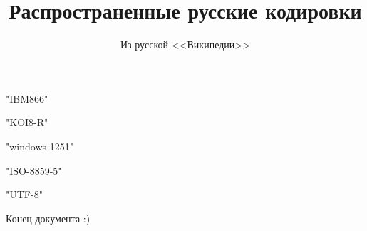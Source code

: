 \documentclass{article}
\title{Распространенные русские кодировки}
\author{Из русской <<Википедии>>}
\date{}
\begin{document}
\maketitle

\tableofcontents


\XeTeXdefaultencoding "IBM866"


\XeTeXdefaultencoding "KOI8-R"


\XeTeXdefaultencoding "windows-1251"


\XeTeXdefaultencoding "ISO-8859-5"


\XeTeXdefaultencoding "UTF-8"


Конец документа :)
\end{document}
